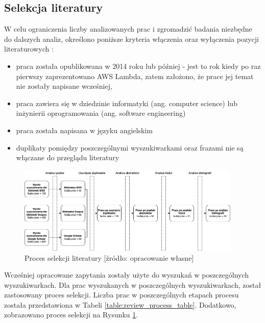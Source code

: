 \subsection{Selekcja literatury}\label{chapter:selekcja_literatury}

W celu ograniczenia liczby analizowanych prac i zgromadzić badania niezbędne do dalszych analiz, określono poniższe kryteria włączenia oraz wyłączenia pozycji literaturowych \cite{cartaxo2020rapidreviewssoftwareengineering}:
\begin{itemize}
    \item praca została opublikowana w 2014 roku lub później - jest to rok kiedy po raz pierwszy zaprezentowano AWS Lambda, zatem założono, że prace jej temat nie zostały napisane wcześniej,
    \item praca zawiera się w dziedzinie informatyki (ang. computer science) lub inżynierii oprogramowania (ang. software engineering)
    \item praca została napisana w języku angielskim
    \item duplikaty pomiędzy poszczególnymi wyszukiwarkami oraz frazami nie są włączane do przeglądu literatury 
\end{itemize}

\begin{figure}[h]
    \centering
    \includegraphics[width=0.95\textwidth]{charts/literature_review_process.drawio.png}
    \caption{Proces selekcji literatury [źródło: opracowanie własne]}
    \label{fig:literature_review_process}
\end{figure}



Wcześniej opracowane zapytania zostały użyte do wyszukań w poszczególnych wyszukiwarkach. 
Dla prac wyszukanych w poszczególnych wyszukiwarkach, został zastosowany proces selekcji.
Liczba prac w poszczególnych etapach procesu została przedstawiona w Tabeli \ref{table:review_process_table}.
Dodatkowo, zobrazowano proces selekcji na Rysunku \ref{fig:literature_review_process}.

